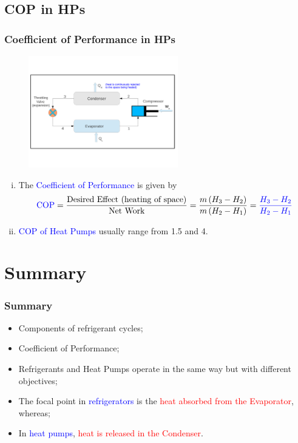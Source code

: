 \documentclass[10pt,compress,handout,ignorenonframetext]{beamer}
\newcommand{\frc}{\displaystyle\frac}
\begin{document}
\subsection{COP in HPs}
\begin{frame}
 \frametitle{Coefficient of Performance in HPs}
    \begin{figure}%
     \begin{center}
      \includegraphics[width=6.5cm,clip]{./Pics/Overview_Refrig36}
     \end{center}
    \end{figure} 


  \begin{enumerate}[(i)]
   \item <1-> The \textcolor{blue}{Coefficient of Performance} is given by
    \begin{displaymath}
     \textcolor{blue}{\text{COP}} = \frc{\text{Desired Effect (heating of space)}}{\text{Net Work}} = \frc{m\left(H_{3}-H_{2}\right)}{m\left(H_{2}-H_{1}\right)} = \textcolor{blue}{\frc{H_{3}-H_{2}}{H_{2}-H_{1}}}
    \end{displaymath}
   \item <2-> \textcolor{blue}{COP of Heat Pumps} usually range from 1.5 and 4.
  \end{enumerate}
\end{frame}


\section{Summary}
\begin{frame}
 \frametitle{Summary}
  \begin{itemize}
   \item <1-> Components of refrigerant cycles;
   \item <2-> Coefficient of Performance;
   \item <3-> Refrigerants and Heat Pumps operate in the same way but with different objectives;
   \item <4-> The focal point in \textcolor{blue}{refrigerators} is the \textcolor{red}{heat absorbed from the Evaporator}, whereas;
   \item <5-> In \textcolor{blue}{heat pumps}, \textcolor{red}{heat is released in the Condenser}.
  \end{itemize}
\end{frame}
\end{document}
